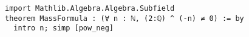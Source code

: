 \begin{lstlisting}[language=Lean]
import Mathlib.Algebra.Algebra.Subfield
theorem MassFormula : (∀ n : ℕ, (2:ℚ) ^ (-n) ≠ 0) := by
  intro n; simp [pow_neg] 
\end{lstlisting}

